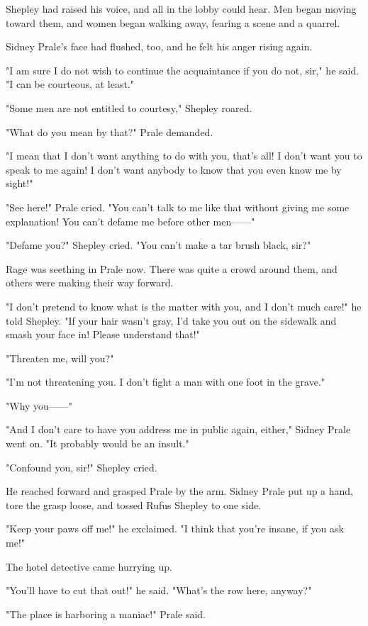 \documentclass{novel}
\begin{document}
Shepley had raised his voice, and all in the lobby could hear. Men began moving toward them, and women began walking away, fearing a scene and a quarrel.

Sidney Prale's face had flushed, too, and he felt his anger rising again.

"I am sure I do not wish to continue the acquaintance if you do not, sir," he said. "I can be courteous, at least."

"Some men are not entitled to courtesy," Shepley roared.

"What do you mean by that?" Prale demanded.

"I mean that I don't want anything to do with you, that's all! I don't want you to speak to me again! I don't want anybody to know that you even know me by sight!"

"See here!" Prale cried. "You can't talk to me like that without giving me some explanation! You can't defame me before other men------"

"Defame you?" Shepley cried. "You can't make a tar brush black, sir?"

Rage was seething in Prale now. There was quite a crowd around them, and others were making their way forward.

"I don't pretend to know what is the matter with you, and I don't much care!" he told Shepley. "If your hair wasn't gray, I'd take you out on the sidewalk and smash your face in! Please understand that!"

"Threaten me, will you?"

"I'm not threatening you. I don't fight a man with one foot in the grave."

"Why you------"

"And I don't care to have you address me in public again, either," Sidney Prale went on. "It probably would be an insult."

"Confound you, sir!" Shepley cried.

He reached forward and grasped Prale by the arm. Sidney Prale put up a hand, tore the grasp loose, and tossed Rufus Shepley to one side.

"Keep your paws off me!" he exclaimed. "I think that you're insane, if you ask me!"

The hotel detective came hurrying up.

"You'll have to cut that out!" he said. "What's the row here, anyway?"

"The place is harboring a maniac!" Prale said.
\end{document}
